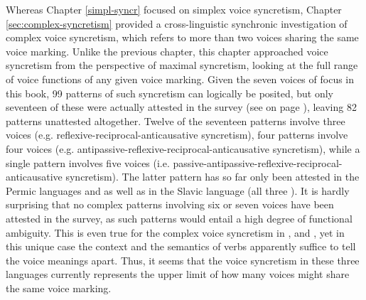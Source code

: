 Whereas Chapter \ref{simpl-syncr} focused on simplex voice syncretism, Chapter \ref{sec:complex-syncretism} provided a cross-linguistic synchronic investigation of complex voice syncretism, which refers to more than two voices sharing the same voice marking. Unlike the previous chapter, this chapter approached voice syncretism from the perspective of maximal syncretism, looking at the full range of voice functions of any given voice marking. Given the seven voices of focus in this book, 99 patterns of such syncretism can logically be posited, but only seventeen of these were actually attested in the survey (see  on page \pageref{tab:ch5:complex-patterns}), leaving 82 patterns unattested altogether. Twelve of the seventeen patterns involve three voices (e.g. reflexive-reciprocal-anticausative syncretism), four patterns involve four voices (e.g. anti\-pas\-sive-re\-flex\-ive-reciprocal-anticausative syncretism), while a single pattern involves five voices (i.e. passive-antipassive-reflexive-reciprocal-anticausative syncretism). The latter pattern has so far only been attested in the Permic languages  and  as well as in the Slavic language  (all three ). It is hardly surprising that no complex patterns involving six or seven voices have been attested in the survey, as such patterns would entail a high degree of functional ambiguity. This is even true for the complex voice syncretism in ,  and , yet in this unique case the context and the semantics of verbs apparently suffice to tell the voice meanings apart. Thus, it seems that the voice syncretism in these three languages currently represents the upper limit of how many voices might share the same voice marking. 

